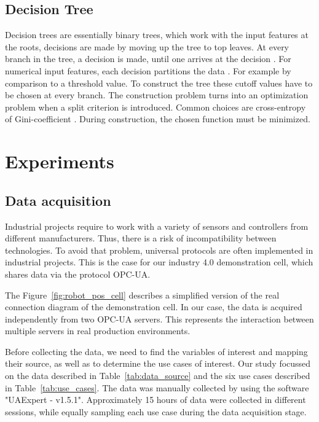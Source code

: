\documentclass[5p,times,procedia]{elsarticle}
\begin{document}
\subsection{Decision Tree}
Decision trees are essentially binary trees, which work with the input
features at the roots, decisions are made by moving
up the tree to top leaves. At every branch in the tree, a decision
is made, until one arrives at the decision \cite{Marsland2015Machine}.
For numerical input features, each decision partitions the data
\cite{aggarwal2015data}. For example by comparison to a threshold value.
To construct the tree these cutoff values have to be chosen at every branch. The construction problem turns into an optimization problem when a split criterion is introduced. Common choices are cross-entropy of Gini-coefficient \cite{aggarwal2015data}.
During construction, the chosen function must be minimized. 


\section{Experiments} \label{sec:experiment}

\subsection{Data acquisition}

Industrial projects require to work with a variety of sensors and controllers from different manufacturers. Thus, there is a risk of incompatibility between technologies. To avoid that problem, universal protocols are often implemented in industrial projects. This is the case for our industry 4.0 demonstration cell, which shares data via the protocol OPC-UA. 

The Figure~\ref{fig:robot_pos_cell} describes a simplified version of the real connection diagram of the demonstration cell. In our case, the data is acquired independently from two OPC-UA servers. This represents the interaction between multiple servers in real production environments. 

Before collecting the data, we need to find the variables of interest and mapping their source, as well as to determine the use cases of interest. Our study focussed on the data described in Table~\ref{tab:data_source} and the six use cases described in Table~\ref{tab:use_cases}. The data was manually collected by using the software "UAExpert - v1.5.1". Approximately 15 hours of data were collected in different sessions, while equally sampling each use case during the data acquisition stage.
\end{document}
